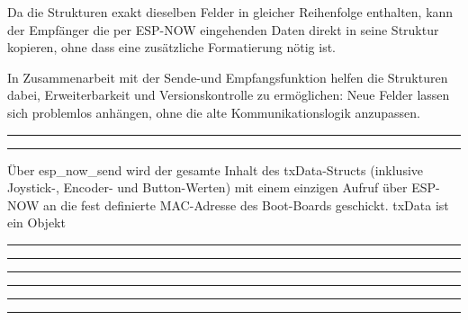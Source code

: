 \documentclass[a4paper,12pt]{article}
\begin{document}
\newpage
Da die Strukturen exakt dieselben Felder in gleicher Reihenfolge enthalten, kann der Empfänger die per ESP-NOW eingehenden Daten direkt in seine Struktur kopieren, ohne dass eine zusätzliche Formatierung nötig ist.

In Zusammenarbeit mit der Sende-und Empfangsfunktion helfen die Strukturen dabei, Erweiterbarkeit und Versionskontrolle zu ermöglichen: Neue Felder lassen sich problemlos anhängen, ohne die alte Kommunikationslogik anzupassen.

\noindent\rule{\linewidth}{0.4pt}  %



\noindent\rule{\linewidth}{0.4pt}  %


Über esp\_now\_send wird der gesamte Inhalt des txData-Structs (inklusive Joystick-, Encoder- und Button-Werten) mit einem einzigen Aufruf über ESP-NOW an die fest definierte MAC-Adresse des Boot-Boards geschickt. txData ist ein Objekt 


\noindent\rule{\linewidth}{0.4pt}  %

\noindent\rule{\linewidth}{0.4pt}  %





\noindent\rule{\linewidth}{0.4pt}  %

\noindent\rule{\linewidth}{0.4pt}  %


\noindent\rule{\linewidth}{0.4pt}  %

\noindent\rule{\linewidth}{0.4pt}  %




\newpage
\end{document}
